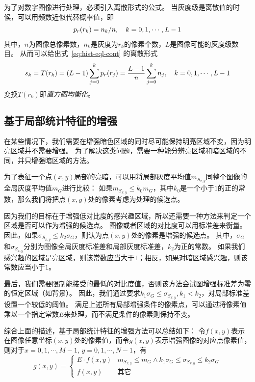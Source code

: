 \documentclass{hitgsrep}
\begin{document}
为了对数字图像进行处理，必须引入离散形式的公式。
当灰度级是离散值的时候，可以用频数近似代替概率值，即
\begin{equation}
    p_r\qty(r_k)=n_k/n\qc{k=0,1,\cdots,L-1}
\end{equation}
其中，$n$为图像总像素数，$n_k$是灰度为$r_k$的像素个数，$L$是图像可能的灰度级数目。
从而可以给出式~\eqref{eq:hist-eql-cont} 的离散形式
\begin{equation}
    s_k=T\qty(r_k)=(L-1)\sum_{j=0}^k p_r(r_j)=\frac{L-1}{n}\sum_{j=0}^k n_j\qc{k=0,1,\cdots,L-1}
\end{equation}
变换$T(r_k)$即\emph{直方图均衡化}。

\subsection{基于局部统计特征的增强}

在某些情况下，我们需要在增强暗色区域的同时尽可能保持明亮区域不变，因为明亮区域并不需要增强。
为了解决这类问题，需要一种能分辨亮区域和暗区域的不同，并只增强暗区域的方法。

为了表征一个点$(x,y)$局部的亮暗，可以用将局部灰度平均值$m_{S_{x,y}}$同整个图像的全局灰度平均值$m_G$进行比较：
如果$m_{S_{x,y}}\le k_0m_G$，其中$k_0$是一个小于$1$的正的常数，那么我们将把点$(x,y)$处的像素考虑为处理的候选点。

因为我们的目标在于增强低对比度的感兴趣区域，所以还需要一种方法来判定一个区域是否可以作为增强的候选点。
图像或者区域的对比度可以用标准差来衡量。
因此，如果$\sigma_{S_{x,y}}\le k_2\sigma_G$，则认为点$(x,y)$处的像素是增强的候选点。
其中，$\sigma_G$和$\sigma_{S_{x,y}}$分别为图像全局灰度标准差和局部灰度标准差，$k_2$为正的常数。
如果我们感兴趣的区域是亮区域，则该常数应当大于$1$；相反，如果对暗区域感兴趣，则该常数应当小于$1$。

最后，我们需要限制能接受的最低的对比度值，否则该方法会试图增强标准差为零的恒定区域（如背景）。
因此，我们通过要求$k_1\sigma_G\le\sigma_{S_{x,y}}, k_1<k_2$，对局部标准差设置一个较低的阈值。
满足上述所有局部增强条件的像素点，可以通过将像素值乘以一个指定常数$E$来处理，而不满足条件的像素则保持不变。

综合上面的描述，基于局部统计特征的增强方法可以总结如下：
令$f(x,y)$表示在图像任意坐标$(x,y)$处的像素值，而令$g(x,y)$表示增强图像的对应点像素值，
则对于$x=0,1,\cdots,M-1,\,y=0,1,\cdots,N-1$，有
\begin{equation}\label{eq:local-enh}
    g(x,y)=\begin{cases}
        E\cdot f(x,y) & m_{S_{x,y}}\le m_G \land k_1\sigma_G\le\sigma_{S_{x,y}}\le k_2\sigma_G\\
        f(x,y) & \text{其它}
    \end{cases}
\end{equation}
\end{document}
